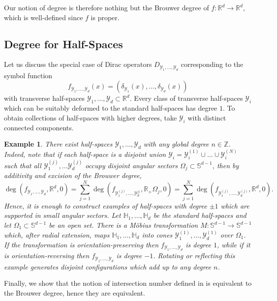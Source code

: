 \documentclass[12pt]{amsart}
\newtheorem{example}[theorem]{Example}
\newcommand{\RM}{{\mathbb R}}
\newcommand{\SM}{{\mathbb S}}
\newcommand{\ZM}{{\mathbb Z}}
\newcommand{\HM}{{\mathbb H}}
\newcommand{\Yy}{{\mathcal Y}}
\begin{document}
Our notion of degree is therefore nothing but the Brouwer degree of $f:\RM^d\to \RM^d$, which is well-defined since $f$ is proper.



\subsection{Degree for Half-Spaces}
\label{sec:deg_hs}
Let us discuss the special case of Dirac operators $D_{\Yy_1,\dots,\Yy_d}$ corresponding to the symbol function
$$f_{\Yy_1,\dots,\Yy_d}(x)= \left(\delta_{\Yy_1}(x),\dots,\delta_{\Yy_d}(x)\right)$$
with transverse half-spaces $\Yy_1,\dots,\Yy_d \subset \RM^d$.
Every class of transverse half-spaces $\Yy_i$ which can be suitably deformed to the standard half-spaces has degree $1$. 
To obtain collections of half-spaces with higher degrees, take $\Yy_i$ with distinct connected components. 

\begin{example}\label{ex:sph_caps}
    \rm{There exist half-spaces $\Yy_1,\dots, \Yy_d$ with any global degree $n \in \ZM$. Indeed, note that if each half-space is a disjoint union $\Yy_i=\Yy_i^{(1)}\cup \dots \cup \Yy_i^{(N)}$ such that all $\Yy_1^{(j)},\dots \Yy_d^{(j)}$ occupy disjoint angular sectors $\Omega_j\subset \SM^{d-1}$, then by additivity and excision of the Brouwer degree,
    \[\deg(f_{\Yy_1,\dots,\Yy_d}, \RM^d,0)=\sum_{j=1}^N \deg(f_{\Yy^{(j)}_1,\dots,\Yy^{j)}_d}, \RM_+\Omega_j,0)=\sum_{j=1}^N \deg(f_{\Yy^{(j)}_1,\dots,\Yy^{(j)}_d}, \RM^d,0).\]
    Hence, it is enough to construct examples of half-spaces with degree $\pm 1$ which are supported in small angular sectors. Let $\HM_1,\dots,\HM_d$ be the standard half-spaces and let $\Omega_1 \subset \SM^{d-1}$ be an open set. There is a Möbius transformation $M: \SM^{d-1} \to \SM^{d-1}$ which, after radial extension, maps $\HM_1,\dots,\HM_d$ into cones $\Yy_1^{(1)},\dots,\Yy_d^{(1)}$ over $\Omega_1$. If the transformation is orientation-preserving then $f_{\Yy_1,\dots,\Yy_d}$ is degree $1$, while if it is orientation-reversing then $f_{\Yy_1,\dots,\Yy_d}$ is degree $-1$. Rotating or reflecting this example generates disjoint configurations which add up to any degree $n$.}
\end{example}

Finally, we show that the notion of intersection number defined in \cite{drouot2024bulk} is equivalent to the Brouwer degree, hence they are equivalent. 
\end{document}
